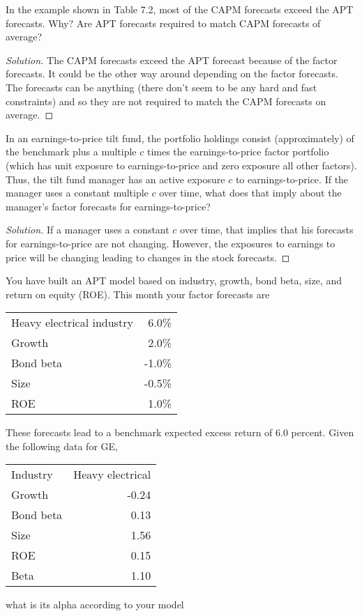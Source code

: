 \begin{problem}{7.3}
 In the example shown in Table 7.2, most of the CAPM forecasts exceed the APT forecasts. Why? Are APT forecasts required to match CAPM forecasts of average?
\end{problem}

\begin{proof}[Solution]
 The CAPM forecasts exceed the APT forecast because of the factor forecasts. It could be the other way around depending on the factor forecasts. The forecasts can be anything (there don't seem to be any hard and fast constraints) and so they are not required to match the CAPM forecasts on average.
\end{proof}

\begin{problem}{7.4}
 In an earnings-to-price tilt fund, the portfolio holdings consist (approximately) of the benchmark plus a multiple $c$ times the earnings-to-price factor portfolio (which has unit exposure to earnings-to-price and zero exposure all other factors). Thus, the tilt fund manager has an active exposure $c$ to earnings-to-price. If the manager uses a constant multiple $c$ over time, what does that imply about the manager's factor forecasts for earnings-to-price?
\end{problem}

\begin{proof}[Solution]
  If a manager uses a constant $c$ over time, that implies that his forecasts for earnings-to-price are not changing. However, the exposures to earnings to price will be changing leading to changes in the stock forecasts.
\end{proof}


\begin{problem}{7.5}
  You have built an APT model based on industry, growth, bond beta, size, and return on equity (ROE). This month your factor forecasts are
  \begin{center}
   \begin{tabular}{l r}
    Heavy electrical industry 	& 6.0\% \\
    Growth			& 2.0\% \\
    Bond beta			& -1.0\% \\
    Size 			& -0.5\% \\
    ROE				&  1.0\% 
   \end{tabular}
  \end{center}
  These forecasts lead to a benchmark expected excess return of 6.0 percent. Given the following data for GE,
  \begin{center}
   \begin{tabular}{l r}
    Industry			& Heavy electrical \\
    Growth			& -0.24 \\
    Bond beta			&  0.13 \\
    Size 			&  1.56 \\
    ROE				&  0.15 \\
    Beta			&  1.10
   \end{tabular}
  \end{center}
  what is its alpha according to your model
\end{problem}

